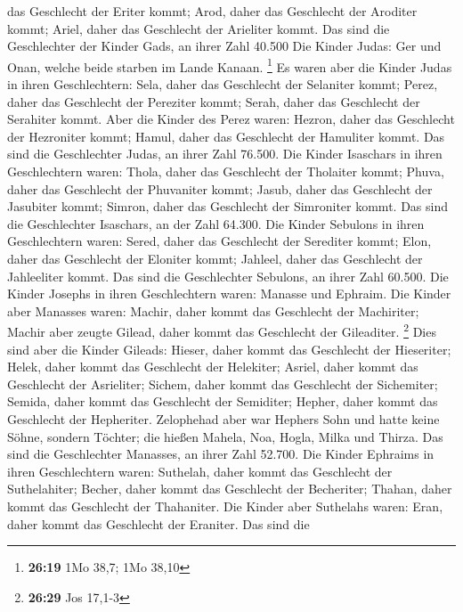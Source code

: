 das Geschlecht der Eriter kommt;  Arod, daher das
Geschlecht der Aroditer kommt; Ariel, daher das Geschlecht der Arieliter
kommt.  Das sind die Geschlechter der Kinder Gads, an ihrer
Zahl 40.500  Die Kinder Judas: Ger und Onan, welche beide
starben im Lande Kanaan. \footnote{\textbf{26:19} 1Mo 38,7; 1Mo 38,10}
 Es waren aber die Kinder Judas in ihren Geschlechtern:
Sela, daher das Geschlecht der Selaniter kommt; Perez, daher das
Geschlecht der Pereziter kommt; Serah, daher das Geschlecht der
Serahiter kommt.  Aber die Kinder des Perez waren: Hezron,
daher das Geschlecht der Hezroniter kommt; Hamul, daher das Geschlecht
der Hamuliter kommt.  Das sind die Geschlechter Judas, an
ihrer Zahl 76.500.  Die Kinder Isaschars in ihren
Geschlechtern waren: Thola, daher das Geschlecht der Tholaiter kommt;
Phuva, daher das Geschlecht der Phuvaniter kommt;  Jasub,
daher das Geschlecht der Jasubiter kommt; Simron, daher das Geschlecht
der Simroniter kommt.  Das sind die Geschlechter Isaschars,
an der Zahl 64.300.  Die Kinder Sebulons in ihren
Geschlechtern waren: Sered, daher das Geschlecht der Serediter kommt;
Elon, daher das Geschlecht der Eloniter kommt; Jahleel, daher das
Geschlecht der Jahleeliter kommt.  Das sind die
Geschlechter Sebulons, an ihrer Zahl 60.500.  Die Kinder
Josephs in ihren Geschlechtern waren: Manasse und Ephraim. 
Die Kinder aber Manasses waren: Machir, daher kommt das Geschlecht der
Machiriter; Machir aber zeugte Gilead, daher kommt das Geschlecht der
Gileaditer. \footnote{\textbf{26:29} Jos 17,1-3}  Dies sind
aber die Kinder Gileads: Hieser, daher kommt das Geschlecht der
Hieseriter; Helek, daher kommt das Geschlecht der Helekiter;
 Asriel, daher kommt das Geschlecht der Asrieliter; Sichem,
daher kommt das Geschlecht der Sichemiter;  Semida, daher
kommt das Geschlecht der Semiditer; Hepher, daher kommt das Geschlecht
der Hepheriter.  Zelophehad aber war Hephers Sohn und hatte
keine Söhne, sondern Töchter; die hießen Mahela, Noa, Hogla, Milka und
Thirza.  Das sind die Geschlechter Manasses, an ihrer Zahl
52.700.  Die Kinder Ephraims in ihren Geschlechtern waren:
Suthelah, daher kommt das Geschlecht der Suthelahiter; Becher, daher
kommt das Geschlecht der Becheriter; Thahan, daher kommt das Geschlecht
der Thahaniter.  Die Kinder aber Suthelahs waren: Eran,
daher kommt das Geschlecht der Eraniter.  Das sind die
